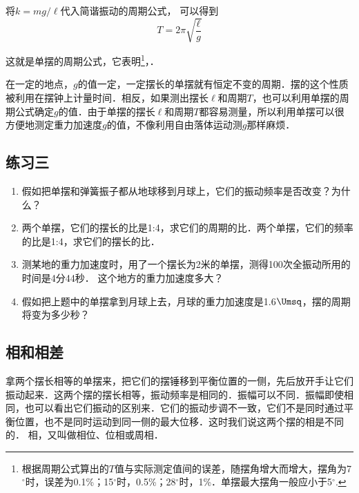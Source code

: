 将$k=mg/\ell$代入简谐振动的周期公式，
可以得到
\[T=2\pi\sqrt{\frac{\ell}{g}}\]

这就是单摆的周期公式，它表明\footnote{根据周期公式算出的$T$值与实际测定值间的误差，随摆角增大而增大，摆角为7$^\circ$时，误差为0.1\%；15$^\circ$时，0.5\%；28$^\circ$时，1\%．单摆最大摆角一般应小于5$^\circ$.}，．

在一定的地点，$g$的值一定，一定摆长的单摆就有恒定不变的周期．摆的这个性质被利用在摆钟上计量时间．相反，如果测出摆长$\ell$和周期$T$，也可以利用单摆的周期公式确定$g$的值．由于单摆的摆长$\ell$和周期$T$都容易测量，所以利用单摆可以很方便地测定重力加速度$g$的值，不像利用自由落体运动测$g$那样麻烦．

\subsection*{练习三}
\begin{enumerate}
    \item 假如把单摆和弹簧振子都从地球移到月球上，它们的振动频率是否改变？为什么？
    \item 两个单摆，它们的摆长的比是1:4，求它们的周期的比．两个单摆，它们的频率的比是1:4，求它们的摆长的比．
    \item 测某地的重力加速度时，用了一个摆长为2米的单摆，测得100次全振动所用的时间是4分44秒．
    这个地方的重力加速度多大？
    \item 假如把上题中的单摆拿到月球上去，月球的重力加速度是1.6$\Umsq$，摆的周期将变为多少秒？
\end{enumerate}

\subsection{相和相差}
拿两个摆长相等的单摆来，把它们的摆锤移到平衡位置的一侧，先后放开手让它们振动起来．这两个摆的摆长相等，振动频率是相同的．振幅可以不同．振幅即使相同，也可以看出它们振动的区别来．它们的振动步调不一致，它们不是同时通过平衡位置，也不是同时运动到同一侧的最大位移．这时我们说这两个摆的相是不同的．
相，又叫做相位、位相或周相．

